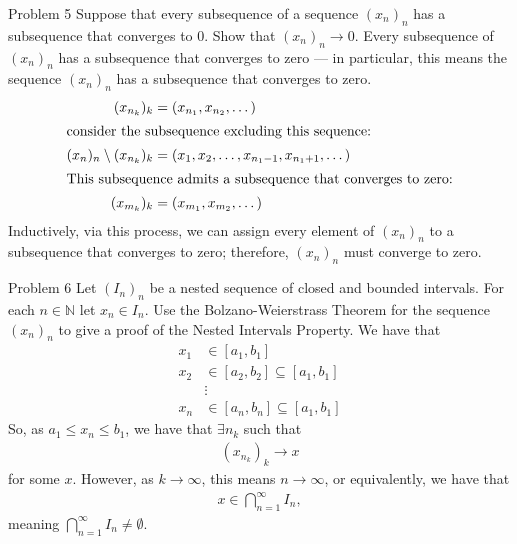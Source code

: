 \documentclass[10pt]{extarticle}
\newcommand{\N}{\mathbb{N}}
\begin{document}
  \begin{problem}{Problem 5}
    Suppose that every subsequence of a sequence $(x_n)_n$ has a subsequence that converges to 0. Show that $(x_n)_n \rightarrow 0$.
    \tcblower
    Every subsequence of $(x_n)_n$ has a subsequence that converges to zero --- in particular, this means the sequence $(x_n)_n$ has a subsequence that converges to zero.
    \begin{align*}
      (x_{n_{k}})_k &= (x_{n_1},x_{n_2},\dots)\\
      \shortintertext{consider the subsequence excluding this sequence:}
      (x_{n})_n \setminus (x_{n_k})_k &= (x_1,x_2,\dots,x_{n_1-1},x_{n_1+1},\dots)\\
      \shortintertext{This subsequence admits a subsequence that converges to zero:}
      (x_{m_k})_k &= (x_{m_1},x_{m_2},\dots)
    \end{align*}
    Inductively, via this process, we can assign every element of $(x_n)_n$ to a subsequence that converges to zero; therefore, $(x_n)_n$ must converge to zero.
  \end{problem}
  \begin{problem}{Problem 6}
    Let $(I_n)_n$ be a nested sequence of closed and bounded intervals. For each $n\in\N$ let $x_n\in I_n$. Use the Bolzano-Weierstrass Theorem for the sequence $(x_n)_n$ to give a proof of the Nested Intervals Property.
    \tcblower
    We have that
    \begin{align*}
      x_1 &\in [a_1,b_1]\\
      x_2 &\in [a_2,b_2]\subseteq [a_1,b_1]\\
       &\vdots \\
      x_n&\in [a_n,b_n] \subseteq [a_1,b_1]
    \end{align*}
    So, as $a_1\leq x_n\leq b_1$, we have that $\exists n_k$ such that
    \begin{align*}
      \left(x_{n_k}\right)_k \rightarrow x
    \end{align*}
    for some $x$. However, as $k\rightarrow\infty$, this means $n\rightarrow\infty$, or equivalently, we have that
    \begin{align*}
      x\in\bigcap_{n=1}^{\infty} I_n,
    \end{align*}
    meaning $\bigcap_{n=1}^{\infty}I_n\neq\emptyset$.
  \end{problem}
\end{document}
